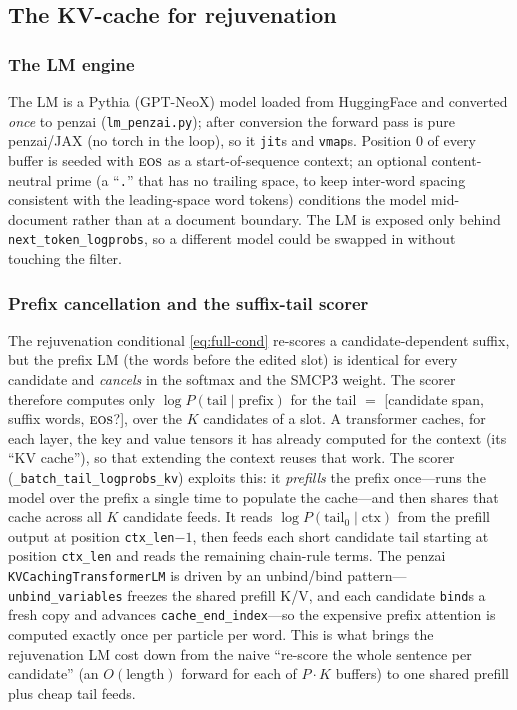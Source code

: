 \documentclass[11pt]{article}
\providecommand{\given}{\mid}
\providecommand{\eos}{\textsc{eos}}
\providecommand{\code}[1]{\texttt{#1}}
\begin{document}
\subsection{The KV-cache for rejuvenation}
\label{sec:kv}

\subsubsection{The LM engine}
\label{sec:lm-engine}
The LM is a Pythia (GPT-NeoX) model loaded from HuggingFace and converted \emph{once} to penzai (\code{lm\_penzai.py}); after conversion the forward pass is pure penzai/JAX (no torch in the loop), so it \code{jit}s and \code{vmap}s. Position $0$ of every buffer is seeded with $\eos$ as a start-of-sequence context; an optional content-neutral prime (a ``\code{.}'' that has no trailing space, to keep inter-word spacing consistent with the leading-space word tokens) conditions the model mid-document rather than at a document boundary. The LM is exposed only behind \code{next\_token\_logprobs}, so a different model could be swapped in without touching the filter.

\subsubsection{Prefix cancellation and the suffix-tail scorer}
The rejuvenation conditional \eqref{eq:full-cond} re-scores a candidate-dependent suffix, but the prefix LM (the words before the edited slot) is identical for every candidate and \emph{cancels} in the softmax and the SMCP3 weight. The scorer therefore computes only $\log P(\text{tail}\given \text{prefix})$ for the tail $=$ [candidate span, suffix words, $\eos$?], over the $K$ candidates of a slot. A transformer caches, for each layer, the key and value tensors it has already computed for the context (its ``KV cache''), so that extending the context reuses that work. The scorer (\code{\_batch\_tail\_logprobs\_kv}) exploits this: it \emph{prefills} the prefix once---runs the model over the prefix a single time to populate the cache---and then shares that cache across all $K$ candidate feeds. It reads $\log P(\text{tail}_0\given \text{ctx})$ from the prefill output at position \code{ctx\_len}$-1$, then feeds each short candidate tail starting at position \code{ctx\_len} and reads the remaining chain-rule terms. The penzai \code{KVCachingTransformerLM} is driven by an unbind/bind pattern---\code{unbind\_variables} freezes the shared prefill K/V, and each candidate \code{bind}s a fresh copy and advances \code{cache\_end\_index}---so the expensive prefix attention is computed exactly once per particle per word. This is what brings the rejuvenation LM cost down from the naive ``re-score the whole sentence per candidate'' (an $O(\text{length})$ forward for each of $P\cdot K$ buffers) to one shared prefill plus cheap tail feeds.
\end{document}
